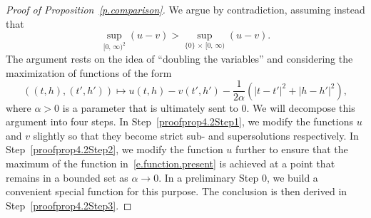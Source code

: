 \documentclass[10pt]{amsart}
\theoremstyle{definition}\newtheorem{defi}[theo]{Definition}\newtheorem{rema}[theo]{Remark}\newtheorem{exam}[theo]{Example}\newtheorem{exem}[theo]{Example}\newtheorem{nota}[theo]{Notation}
\newcommand{\1}{\mathds{1}}
\newcommand{\al}{\alpha}
\newcounter{stepcount}
\begin{document}
\begin{proof}[Proof of Proposition~\ref{p.comparison}]
We argue by contradiction, assuming instead that
\begin{equation}\label{e.max.int}
\sup_{[0,\,\infty)^2} (u-v) > \sup_{\{0\}\,\times\,[0,\,\infty)} (u-v).
\end{equation}
The argument rests on the idea of ``doubling the variables'' and considering the maximization of functions of the form
\begin{equation}\label{e.function.present}
\left((t,h),(t',h')\right) \mapsto u(t,h) - v(t',h') - \frac 1 {2\al} \left(|t-t'|^2 + |h-h'|^2 \right),
\end{equation}
where $\alpha > 0$ is a parameter that is ultimately sent to $0$. We will decompose this argument into four steps. In Step~\ref{proofprop4.2Step1}, we modify the functions $u$ and $v$ slightly so that they become strict sub- and supersolutions respectively. In Step~\ref{proofprop4.2Step2}, we modify the function $u$ further to ensure that the maximum of the function in~\eqref{e.function.present} is achieved at a point that remains in a bounded set as $\al \to 0$. In a preliminary Step 0, we build a convenient special function for this purpose. The conclusion is then derived in Step~\ref{proofprop4.2Step3}.


\setcounter{stepcount}{-1}


\end{proof}
\end{document}
